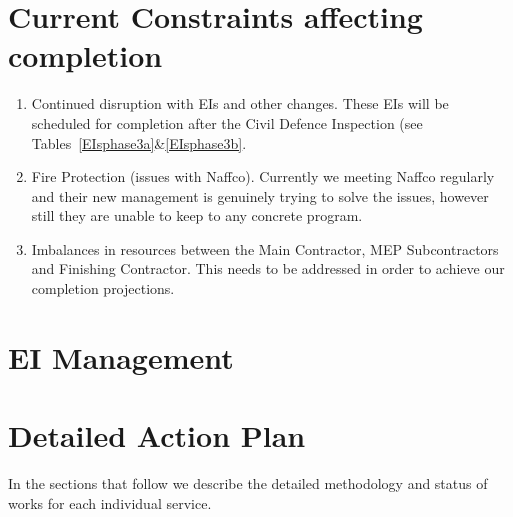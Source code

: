 \section*{Current Constraints affecting completion}

\begin{enumerate}
\item Continued disruption with EIs and other changes. These EIs will be scheduled for completion after the Civil Defence Inspection (see Tables~\ref{EIsphase3a}\&\ref{EIsphase3b}.
\item Fire Protection (issues with Naffco). Currently we meeting Naffco regularly and their new management is genuinely trying to solve the issues, however still they are unable to keep to any concrete program.
\item Imbalances in resources between the Main Contractor, MEP Subcontractors and Finishing Contractor. This needs to be addressed in order to achieve our completion projections.
\end{enumerate}

\section*{EI Management}


\section{Detailed Action Plan}

In the sections that follow we describe the detailed methodology and status of works for each individual service.





